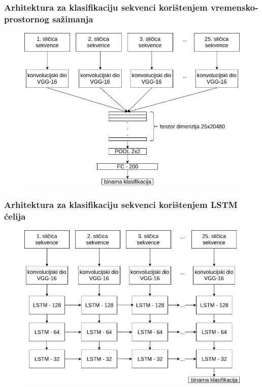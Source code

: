 \documentclass{beamer}
\begin{document}
\begin{frame}
\frametitle{Arhitektura za klasifikaciju sekvenci korištenjem vremensko-prostornog sažimanja}

 \begin{figure}[H]
\centering
\includegraphics[scale=0.35]{images/sequence_pooling.png}
\end{figure} 

\end{frame}

\begin{frame}
\frametitle{Arhitektura za klasifikaciju sekvenci korištenjem LSTM ćelija}

 \begin{figure}[H]
\centering
\includegraphics[scale=0.35]{images/sequence_lstm.png}
\end{figure} 

\end{frame}
\end{document}
